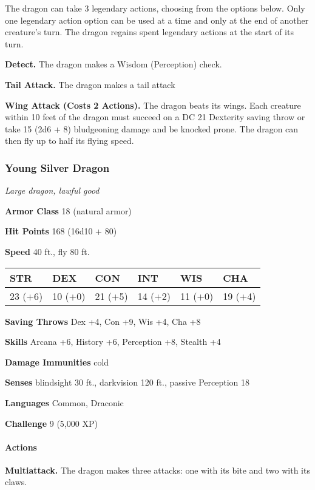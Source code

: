 \documentclass[
]{article}
\begin{document}
The dragon can take 3 legendary actions, choosing from the options
below. Only one legendary action option can be used at a time and only
at the end of another creature's turn. The dragon regains spent
legendary actions at the start of its turn.

\textbf{Detect.} The dragon makes a Wisdom (Perception) check.

\textbf{Tail Attack.} The dragon makes a tail attack

\textbf{Wing Attack (Costs 2 Actions).} The dragon beats its wings. Each
creature within 10 feet of the dragon must succeed on a DC 21 Dexterity
saving throw or take 15 (2d6 + 8) bludgeoning damage and be knocked
prone. The dragon can then fly up to half its flying speed.

\hypertarget{young-silver-dragon}{%
\subsubsection{Young Silver Dragon}\label{young-silver-dragon}}

\emph{Large dragon, lawful good}

\textbf{Armor Class} 18 (natural armor)

\textbf{Hit Points} 168 (16d10 + 80)

\textbf{Speed} 40 ft., fly 80 ft.

\begin{longtable}[]{@{}llllll@{}}
\toprule
STR & DEX & CON & INT & WIS & CHA\tabularnewline
\midrule
\endhead
23 (+6) & 10 (+0) & 21 (+5) & 14 (+2) & 11 (+0) & 19 (+4)\tabularnewline
\bottomrule
\end{longtable}

\textbf{Saving Throws} Dex +4, Con +9, Wis +4, Cha +8

\textbf{Skills} Arcana +6, History +6, Perception +8, Stealth +4

\textbf{Damage Immunities} cold

\textbf{Senses} blindsight 30 ft., darkvision 120 ft., passive
Perception 18

\textbf{Languages} Common, Draconic

\textbf{Challenge} 9 (5,000 XP)

\hypertarget{actions-61}{%
\paragraph{Actions}\label{actions-61}}

\textbf{Multiattack.} The dragon makes three attacks: one with its bite
and two with its claws.
\end{document}
